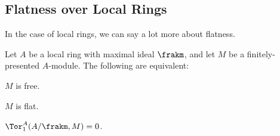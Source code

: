 \subsection{Flatness over Local Rings}
In the case of local rings, we can say a lot more about flatness.
\begin{theorem}
    \label{thm:flat_local_ring}
    Let $A$ be a local ring with maximal ideal $\frakm$, and let $M$ be a finitely-presented $A$-module. The following are equivalent:
    \begin{alphenum}
        \item $M$ is free.
        \item $M$ is flat.
        \item $\Tor_1^A(A/\frakm, M)=0$.
    \end{alphenum}
\end{theorem}
